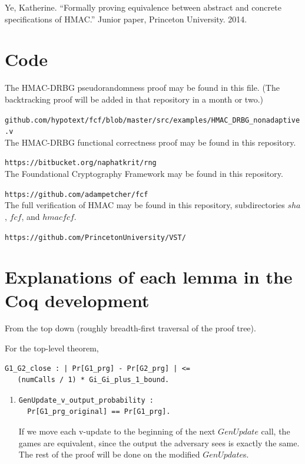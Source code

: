\documentclass[12pt,lot, lof]{puthesis}
\newcommand{\li} {\lstinline}
\begin{document}
{\begin{thebibliography}{99}
Ye, Katherine. ``Formally proving equivalence between abstract and concrete specifications of HMAC.'' Junior paper, Princeton University. 2014.

\end{thebibliography}

 \appendix

\chapter{Code}

The HMAC-DRBG pseudorandomness proof may be found in this file. (The backtracking proof will be added in that repository in a month or two.) 

\li|github.com/hypotext/fcf/blob/master/src/examples/HMAC_DRBG_nonadaptive.v| \\

\noindent The HMAC-DRBG functional correctness proof may be found in this repository. 

\li|https://bitbucket.org/naphatkrit/rng| \\

\noindent The Foundational Cryptography Framework may be found in this repository. 

\li|https://github.com/adampetcher/fcf| \\

\noindent The full verification of HMAC may be found in this repository, subdirectories $sha$, $fcf$, and $hmacfcf$. 

\li|https://github.com/PrincetonUniversity/VST/|

\chapter{Explanations of each lemma in the Coq development}

From the top down (roughly breadth-first traversal of the proof tree).

For the top-level theorem, 
\begin{lstlisting}
G1_G2_close : | Pr[G1_prg] - Pr[G2_prg] | <= 
   (numCalls / 1) * Gi_Gi_plus_1_bound.
\end{lstlisting}
\begin{enumerate}
\par
\item \begin{lstlisting}
GenUpdate_v_output_probability :
  Pr[G1_prg_original] == Pr[G1_prg].
  \end{lstlisting}
If we move each v-update to the beginning of the next $GenUpdate$ call, the games are equivalent, since the output the adversary sees is exactly the same. The rest of the proof will be done on the modified $GenUpdate$s.


\end{enumerate}}
\end{document}
